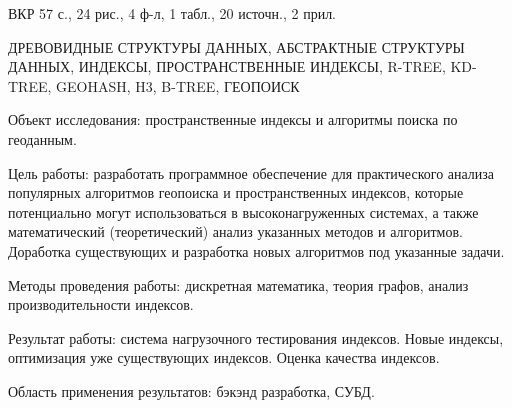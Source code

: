 
ВКР 57 с., 24 рис., 4 ф-л, 1 табл., 20 источн., 2 прил. %

\noindent ДРЕВОВИДНЫЕ СТРУКТУРЫ ДАННЫХ, АБСТРАКТНЫЕ СТРУКТУРЫ ДАННЫХ, ИНДЕКСЫ, ПРОСТРАНСТВЕННЫЕ ИНДЕКСЫ, R-TREE, KD-TREE, GEOHASH, H3, B-TREE, ГЕОПОИСК


Объект исследования: пространственные индексы и алгоритмы поиска по геоданным. 

Цель работы: разработать программное обеспечение для практического анализа популярных алгоритмов геопоиска и пространственных индексов, которые потенциально могут использоваться в высоконагруженных системах, а также математический (теоретический) анализ указанных методов и алгоритмов. Доработка существующих и разработка новых алгоритмов под указанные задачи.

Методы проведения работы: дискретная математика, теория графов, анализ производительности индексов. 

Результат работы: система нагрузочного тестирования индексов. Новые индексы, оптимизация уже существующих индексов. Оценка качества индексов. 

Область применения результатов: бэкэнд разработка, СУБД.



